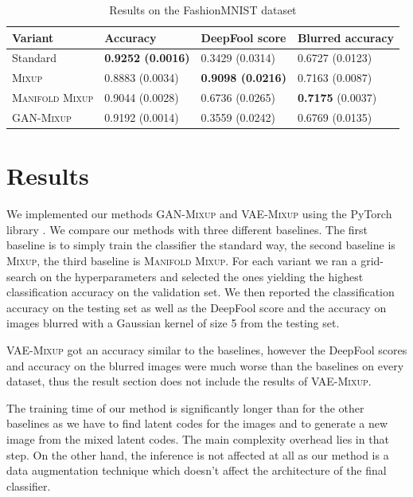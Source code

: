 \documentclass[nohyperref]{article}
\theoremstyle{plain}
\theoremstyle{definition}
\theoremstyle{remark}
\begin{document}
\begin{table}[htbp]
\small
  \centering
  \begin{tabular}[c]{|l||l|l|l|}
    \hline
    Variant & Accuracy & DeepFool score & Blurred accuracy\\
    \hline
    Standard & \textbf{0.9252 (0.0016)} & 0.3429 (0.0314) & 0.6727 (0.0123) \\
    \textsc{Mixup} & 0.8883 (0.0034) & \textbf{0.9098 (0.0216)} & 0.7163 (0.0087) \\
    \textsc{Manifold Mixup} & 0.9044 (0.0028) & 0.6736 (0.0265) & \textbf{0.7175} (0.0037) \\
    \textsc{GAN-Mixup} & 0.9192 (0.0014) & 0.3559 (0.0242) & 0.6769 (0.0135) \\
    \hline
  \end{tabular}
  \caption{Results on the FashionMNIST dataset}
  \label{tab:resultsfashionmnist}
\end{table}



\section{Results}
We implemented our methods \textsc{GAN-Mixup} and \textsc{VAE-Mixup} using the PyTorch library \cite{pytorch}. We compare our methods with three different baselines. The first baseline is to simply train the classifier the standard way, the second baseline is \textsc{Mixup}, the third baseline is \textsc{Manifold Mixup}. For each variant we ran a grid-search on the hyperparameters and selected the ones yielding the highest classification accuracy on the validation set. We then reported the classification accuracy on the testing set as well as the DeepFool \cite{DeepFool} score and the accuracy on images blurred with a Gaussian kernel of size 5 from the testing set.

\textsc{VAE-Mixup} got an accuracy similar to the baselines, however the DeepFool scores and accuracy on the blurred images were much worse than the baselines on every dataset, thus the result section does not include the results of \textsc{VAE-Mixup}.

The training time of our method is significantly longer than for the other baselines as we have to find latent codes for the images and to generate a new image from the mixed latent codes. The main complexity overhead lies in that step. On the other hand, the inference is not affected at all as our method is a data augmentation technique which doesn't affect the architecture of the final classifier.
\end{document}
